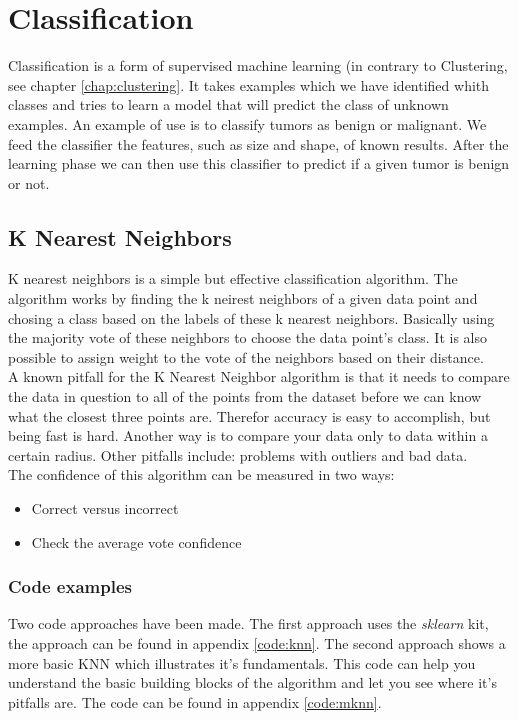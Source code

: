 \chapter{Classification}
Classification is a form of supervised machine learning (in contrary to Clustering, see chapter \ref{chap:clustering}. It takes examples which we have identified whith classes and tries to learn a model that will predict the class of unknown examples. An example of use is to classify tumors as benign or malignant. We feed the classifier the features, such as size and shape, of known results. After the learning phase we can then use this classifier to predict if a given tumor is benign or not.

\section{K Nearest Neighbors}
K nearest neighbors is a simple but effective classification algorithm. The algorithm works by finding the k neirest neighbors of a given data point and chosing a class based on the labels of these k nearest neighbors. Basically using the majority vote of these neighbors to choose the data point's class. It is also possible to assign weight to the vote of the neighbors based on their distance.
\\
A known pitfall for the K Nearest Neighbor algorithm is that it needs to compare the data in question to all of the points from the dataset before we can know what the closest three points are. Therefor accuracy is easy to accomplish, but being fast is hard. Another way is to compare your data only to data within a certain radius. Other pitfalls include: problems with outliers and bad data.
\\
The confidence of this algorithm can be measured in two ways:
\begin{itemize}
\item Correct versus incorrect
\item Check the average vote confidence
\end{itemize}

\subsection{Code examples}
Two code approaches have been made. The first approach uses the \emph{sklearn} kit, the approach can be found in appendix \ref{code:knn}. The second approach shows a more basic KNN which illustrates it's fundamentals. This code can help you understand the basic building blocks of the algorithm and let you see where it's pitfalls are. The code can be found in appendix \ref{code:mknn}.

